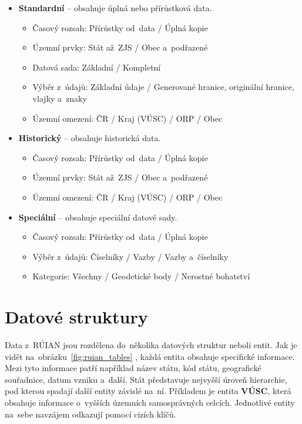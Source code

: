 \begin{itemize}
    \item \textbf{Standardní} -- obsahuje úplná nebo přírůstková data.
    \begin{itemize}[itemsep=-1pt]
        \item Časový rozsah: Přírůstky od~data / Úplná kopie
        \item Územní prvky: Stát až~ZJS / Obec a~podřazené
        \item Datová sada: Základní / Kompletní
        \item Výběr z~údajů: Základní údaje / Generované hranice, originální hranice, vlajky a~znaky
        \item Územní omezení: ČR / Kraj (VÚSC) / ORP / Obec
    \end{itemize}

    \item \textbf{Historický} -- obsahuje historická data.
    \begin{itemize}[itemsep=-1pt]
        \item Časový rozsah: Přírůstky od~data / Úplná kopie
        \item Územní prvky: Stát až~ZJS / Obec a~podřazené
        \item Územní omezení: ČR / Kraj (VÚSC) / ORP / Obec
    \end{itemize}

    \item \textbf{Speciální} -- obsahuje speciální datové sady.
    \begin{itemize}[itemsep=-1pt]
        \item Časový rozsah: Přírůstky od~data / Úplná kopie
        \item Výběr z~údajů: Číselníky / Vazby / Vazby a~číselníky
        \item Kategorie: Všechny / Geodetické body / Nerostné bohatství
    \end{itemize}
\end{itemize}

\section{Datové struktury}
Data z~RÚIAN jsou rozdělena do~několika datových struktur neboli entit.
Jak je vidět na~obrázku~\ref{fig:ruian_tables} \cite{ruian_vfr}, každá entita obsahuje specifické informace.
Mezi tyto informace patří například název státu, kód státu, geografické souřadnice, datum vzniku a~další.
Stát představuje nejvyšší úroveň hierarchie, pod kterou spadají další entity závislé na~ní.
Příkladem je entita \textbf{VÚSC}, která obsahuje informace o~vyšších územních samosprávných celcích.
Jednotlivé entity na~sebe navzájem odkazují pomocí cizích klíčů.

